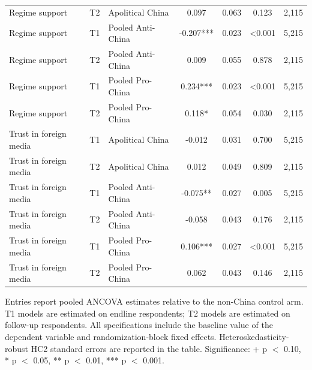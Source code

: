 \begin{table}[H]
\begin{threeparttable}
\begin{tabular}{lllcccc}
Regime support & T2 & Apolitical China & 0.097 & 0.063 & 0.123 & 2,115 \\
Regime support & T1 & Pooled Anti-China & -0.207*** & 0.023 & <0.001 & 5,215 \\
Regime support & T2 & Pooled Anti-China & 0.009 & 0.055 & 0.878 & 2,115 \\
Regime support & T1 & Pooled Pro-China & 0.234*** & 0.023 & <0.001 & 5,215 \\
Regime support & T2 & Pooled Pro-China & 0.118* & 0.054 & 0.030 & 2,115 \\
Trust in foreign media & T1 & Apolitical China & -0.012 & 0.031 & 0.700 & 5,215 \\
Trust in foreign media & T2 & Apolitical China & 0.012 & 0.049 & 0.809 & 2,115 \\
Trust in foreign media & T1 & Pooled Anti-China & -0.075** & 0.027 & 0.005 & 5,215 \\
Trust in foreign media & T2 & Pooled Anti-China & -0.058 & 0.043 & 0.176 & 2,115 \\
Trust in foreign media & T1 & Pooled Pro-China & 0.106*** & 0.027 & <0.001 & 5,215 \\
Trust in foreign media & T2 & Pooled Pro-China & 0.062 & 0.043 & 0.146 & 2,115 \\
\bottomrule
\end{tabular}
\begin{tablenotes}[flushleft]
\footnotesize
\item Entries report pooled ANCOVA estimates relative to the non-China control arm. T1 models are estimated on endline respondents; T2 models are estimated on follow-up respondents. All specifications include the baseline value of the dependent variable and randomization-block fixed effects. Heteroskedasticity-robust HC2 standard errors are reported in the table. Significance: + p $<$ 0.10, * p $<$ 0.05, ** p $<$ 0.01, *** p $<$ 0.001.
\end{tablenotes}
\end{threeparttable}
\end{table}
